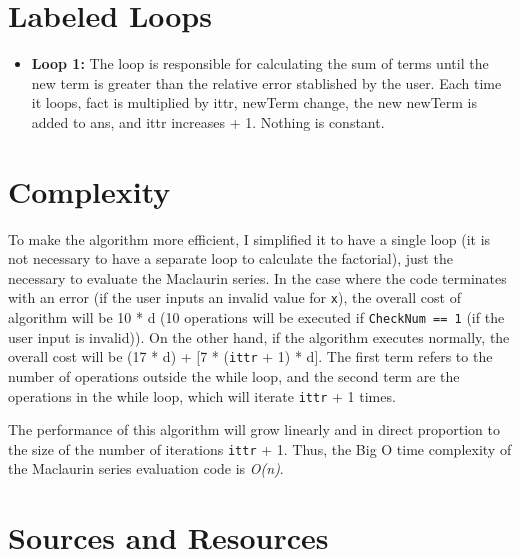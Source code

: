 \documentclass{article}
\begin{document}
\newpage

\section{Labeled Loops}

\begin{itemize}
  \item \textbf{Loop 1:} The loop is responsible for calculating the sum of terms until the new term is greater than the relative error stablished by the user. Each time it loops, fact is multiplied by ittr, newTerm change, the new newTerm is added to ans, and ittr increases + 1. Nothing is constant. \\
\end{itemize}

\section{Complexity}

To make the algorithm more efficient, I simplified it to have a single loop (it is not necessary to have a separate loop to calculate the factorial), just the necessary to evaluate the Maclaurin series. In the case where the code terminates with an error (if the user inputs an invalid value for \texttt{x}), the overall cost of algorithm will be 10 * d (10 operations will be executed if \texttt{CheckNum == 1} (if the user input is invalid)). On the other hand, if the algorithm executes normally, the overall cost will be (17 * d) + [7 * (\texttt{ittr} + 1) * d]. The first term refers to the number of operations outside the while loop, and the second term are the operations in the while loop, which will iterate \texttt{ittr} + 1 times.

The performance of this algorithm will grow linearly and in direct proportion to the size of the number of iterations \texttt{ittr} + 1. Thus, the Big O time complexity of the Maclaurin series evaluation code is \textit{O(n)}.


\newpage

\section{Sources and Resources}
\end{document}
